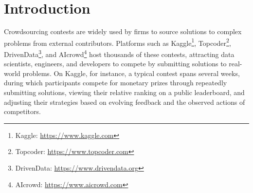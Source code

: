 \documentclass[mnsc]{informs3}
\begin{document}
%


\newpage
\section{Introduction}

Crowdsourcing contests are widely used by firms to source solutions to complex problems from external contributors. 
Platforms such as Kaggle\footnote{Kaggle: \url{https://www.kaggle.com}}, Topcoder\footnote{Topcoder: \url{https://www.topcoder.com}}, DrivenData\footnote{DrivenData: \url{https://www.drivendata.org}}, and AIcrowd\footnote{AIcrowd: \url{https://www.aicrowd.com}} host thousands of these contests, attracting data scientists, engineers, and developers to compete by submitting solutions to real-world problems. 
On Kaggle, for instance, a typical contest spans several weeks, during which participants compete for monetary prizes through repeatedly submitting solutions, viewing their relative ranking on a public leaderboard, and adjusting their strategies based on evolving feedback and the observed actions of competitors. 
\end{document}
